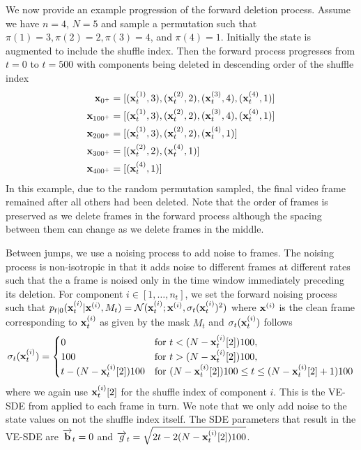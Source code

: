 We now provide an example progression of the forward deletion process. Assume we have $n=4$, $N=5$ and sample a permutation such that $\pi(1)=3, \pi(2)=2, \pi(3)=4$, and $\pi(4)=1$. Initially the state is augmented to include the shuffle index. Then the forward process progresses from $t=0$ to $t=500$ with components being deleted in descending order of the shuffle index
\begin{align}
    {\mathbf{x}}_{0^+}&=[({\mathbf{x}}^{(1)}_{t}, 3), ({\mathbf{x}}^{(2)}_{t}, 2), ({\mathbf{x}}^{(3)}_{t}, 4), ({\mathbf{x}}^{(4)}_{t}, 1)]\\
    {\mathbf{x}}_{100^+} &= [({\mathbf{x}}^{(1)}_{t}, 3), ({\mathbf{x}}^{(2)}_{t}, 2), ({\mathbf{x}}^{(3)}_{t}, 4), ({\mathbf{x}}^{(4)}_{t}, 1)]\\
    {\mathbf{x}}_{200^+} &= [({\mathbf{x}}^{(1)}_{t}, 3), ({\mathbf{x}}^{(2)}_{t}, 2), ({\mathbf{x}}^{(4)}_{t}, 1)]\\
    {\mathbf{x}}_{300^+} &= [({\mathbf{x}}^{(2)}_{t}, 2), ({\mathbf{x}}^{(4)}_{t}, 1)]\\
    {\mathbf{x}}_{400^+} &= [({\mathbf{x}}^{(4)}_{t}, 1)]\\
\end{align}
In this example, due to the random permutation sampled, the final video frame remained after all others had been deleted. Note that the order of frames is preserved as we delete frames in the forward process although the spacing between them can change as we delete frames in the middle.


Between jumps, we use a noising process to add noise to frames. The noising process is non-isotropic in that it adds noise to different frames at different rates such that the a frame is noised only in the time window immediately preceding its deletion. For component $i \in [1, \dots, n_t]$, we set the forward noising process such that $p_{t|0}({\mathbf{x}}_t^{(i)} | {\mathbf{x}}^{(i)}, M_t) = \mathcal{N}({\mathbf{x}}_t^{(i)}; {\mathbf{x}}^{(i)}, \sigma_t({\mathbf{x}}_t^{(i)})^2)$ where ${\mathbf{x}}^{(i)}$ is the clean frame corresponding to ${\mathbf{x}}_t^{(i)}$ as given by the mask $M_t$ and $\sigma_t({\mathbf{x}}_t^{(i)})$ follows
\begin{equation}
    \sigma_t({\mathbf{x}}_t^{(i)}) = \begin{cases}
        0 & \text{for } t < (N - {\mathbf{x}}_t^{(i)}[2]) 100,\\
        100 & \text{for } t > (N - {\mathbf{x}}_t^{(i)}[2]) 100,\\
        t - (N - {\mathbf{x}}_t^{(i)}[2])100 & \text{for } (N - {\mathbf{x}}_t^{(i)}[2])100 \leq t \leq (N - {\mathbf{x}}_t^{(i)}[2]+1) 100
    \end{cases}
\end{equation}
where we again use ${\mathbf{x}}_t^{(i)}[2]$ for the shuffle index of component $i$. This is the VE-SDE from \citet{song2020score} applied to each frame in turn. We note that we only add noise to the state values on not the shuffle index itself. The SDE parameters that result in the VE-SDE are $\overrightarrow{\mathbf{b}}_t = 0$ and $\overrightarrow{g}_t = \sqrt{2t - 2(N - {\mathbf{x}}_t^{(i)}[2])100}$.



